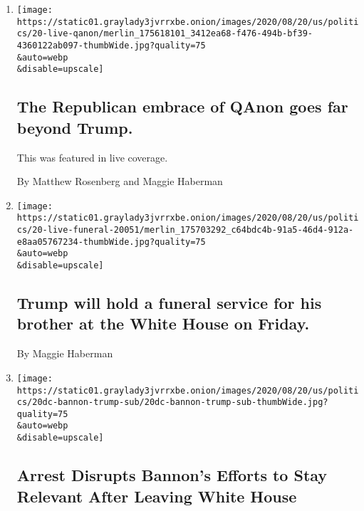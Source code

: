 \begin{enumerate}
\def\labelenumi{\arabic{enumi}.}
\item
  \href{/live/2020/08/20/us/dnc-convention-election/the-republican-embrace-of-qanon-goes-far-beyond-trump}{}

  \texttt{[image: https://static01.graylady3jvrrxbe.onion/images/2020/08/20/us/politics/20-live-qanon/merlin\_175618101\_3412ea68-f476-494b-bf39-4360122ab097-thumbWide.jpg?quality=75\\\&auto=webp\\\&disable=upscale]}

  \hypertarget{the-republican-embrace-of-qanon-goes-far-beyond-trump}{%
  \subsection{The Republican embrace of QAnon goes far beyond
  Trump.}\label{the-republican-embrace-of-qanon-goes-far-beyond-trump}}

  This was featured in live coverage.

  By Matthew Rosenberg and Maggie Haberman
\item
  \href{/2020/08/20/us/elections/trump-will-hold-a-funeral-service-for-his-brother-at-the-white-house-on-friday.html}{}

  \texttt{[image: https://static01.graylady3jvrrxbe.onion/images/2020/08/20/us/politics/20-live-funeral-20051/merlin\_175703292\_c64bdc4b-91a5-46d4-912a-e8aa05767234-thumbWide.jpg?quality=75\\\&auto=webp\\\&disable=upscale]}

  \hypertarget{trump-will-hold-a-funeral-service-for-his-brother-at-the-white-house-on-friday}{%
  \subsection{Trump will hold a funeral service for his brother at the
  White House on
  Friday.}\label{trump-will-hold-a-funeral-service-for-his-brother-at-the-white-house-on-friday}}

  By Maggie Haberman
\item
  \href{/2020/08/20/us/politics/stephen-bannon-arrest.html}{}

  \texttt{[image: https://static01.graylady3jvrrxbe.onion/images/2020/08/20/us/politics/20dc-bannon-trump-sub/20dc-bannon-trump-sub-thumbWide.jpg?quality=75\\\&auto=webp\\\&disable=upscale]}

  \hypertarget{arrest-disrupts-bannons-efforts-to-stay-relevant-after-leaving-white-house}{%
  \subsection{Arrest Disrupts Bannon's Efforts to Stay Relevant After
  Leaving White
  House}\label{arrest-disrupts-bannons-efforts-to-stay-relevant-after-leaving-white-house}}


\end{enumerate}
